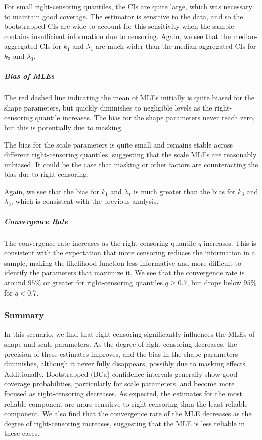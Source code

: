 \documentclass[
]{article}
\theoremstyle{definition}
\theoremstyle{plain}
\theoremstyle{definition}
\theoremstyle{definition}
\theoremstyle{definition}
\theoremstyle{definition}
\theoremstyle{remark}
\begin{document}
For small right-censoring quantiles, the CIs are quite large, which was
necessary to maintain good coverage. The estimator is sensitive to the data,
and so the bootstrapped CIs are wide to account for this sensitivity when the
sample contains insufficient information due to censoring. Again, we see
that the median-aggregated CIs for \(k_1\) and \(\lambda_1\) are much wider than
the median-aggregated CIs for \(k_3\) and \(\lambda_3\).

\hypertarget{bias-of-mles}{%
\subparagraph*{Bias of MLEs}\label{bias-of-mles}}

The red dashed line indicating the mean of MLEs initially is quite biased
for the shape parameters, but quickly diminishes to negligible levels as the
right-censoring quantile increases. The bias for the shape parameters never
reach zero, but this is potentially due to masking.

The bias for the scale parameters is quite small and remains stable across
different right-censoring quantiles, suggesting that the scale MLEs are
reasonably unbiased. It could be the case that masking or other factors are
counteracting the bias due to right-censoring.

Again, we see that the bias for \(k_1\) and \(\lambda_1\) is much greater than the
bias for \(k_3\) and \(\lambda_3\), which is consistent with the previous analysis.

\hypertarget{convergence-rate}{%
\subparagraph*{Convergence Rate}\label{convergence-rate}}

The convergence rate increases as the right-censoring quantile \(q\)
increases. This is consistent with the expectation that more censoring
reduces the information in a sample, making the likelihood function less
informative and more difficult to identify the parameters that maximize it. We
see that the convergence rate is around \(95\%\) or greater for right-censoring
quantiles \(q \geq 0.7\), but drops below \(95\%\) for \(q < 0.7\).

\hypertarget{summary}{%
\subsubsection{Summary}\label{summary}}

In this scenario, we find that right-censoring significantly influences the MLEs
of shape and scale parameters. As the degree of right-censoring decreases, the
precision of these estimates improves, and the bias in the shape parameters
diminishes, although it never fully disappears, possibly due to masking effects.
Additionally, Bootstrapped (BCa) confidence intervals generally show good
coverage probabilities, particularly for scale parameters, and become more
focused as right-censoring decreases. As expected, the estimates for the most
reliable component are more sensitive to right-censoring than the least
reliable component. We also find that the convergence rate of the MLE decreases
as the degree of right-censoring increases, suggesting that the MLE is less
reliable in these cases.
\end{document}
